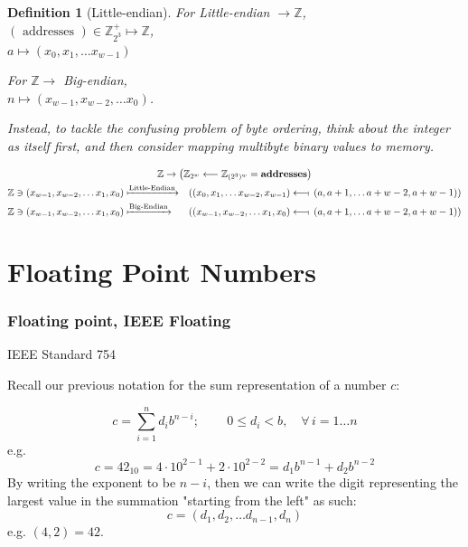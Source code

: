 \documentclass[10pt]{amsart}
\newtheorem{definition}{Definition}
\begin{document}
\begin{multicols*}{2}
\begin{definition}[Little-endian]
For Little-endian $\to \mathbb{Z}$, \\
$( \text{ addresses } ) \in \mathbb{Z}^+_{2^3} \mapsto \mathbb{Z}$, \\
$a \mapsto (x_0, x_1, \dots x_{w-1})$

For $\mathbb{Z} \to $ Big-endian, \\
$n \mapsto (x_{w-1}, x_{w-2}, \dots x_0)$.

Instead, to tackle the confusing problem of byte ordering, think about the integer as itself first, and then consider \emph{mapping multibyte binary values to memory}.

\begin{equation}
\begin{gathered}
\mathbb{Z} \to \left( \mathbb{Z}_{2^w} \longleftarrow \mathbb{Z}_{(2^3)^w} = \textbf{addresses}  \right) \\
\begin{aligned}
& \mathbb{Z} \ni (x_{w-1}, x_{w-2}, \dots x_1, x_0) \xmapsto{\text{Little-Endian}}  & \left((x_0, x_1 , \dots x_{w-2}, x_{w-1}) \longleftarrow\!\shortmid \,  (a, a+1, \dots a + w-2, a+w-1)\right) \\
& \mathbb{Z} \ni (x_{w-1}, x_{w-2}, \dots x_1, x_0) \xmapsto{\text{Big-Endian}}  & \left((x_{w-1}, x_{w-2} , \dots x_{1}, x_{0}) \longleftarrow\!\shortmid \,  (a, a+1, \dots a + w-2, a+w-1)\right) 
\end{aligned}
\end{gathered}
\end{equation}
	
\end{definition}

\part{Floating Point Numbers}

\section{Floating point, IEEE Floating}

IEEE Standard 754

Recall our previous notation for the sum representation of a number $c$:

\begin{equation}
c = \sum_{i=1}^n d_i b^{n-i}; \qquad \, 0 \leq d_i < b , \quad \forall \, i = 1\dots n 
\end{equation}
e.g.
\[
c = 42_{10} = 4 \cdot 10^{2-1} + 2\cdot 10^{2-2} = d_1 b^{n-1} + d_2 b^{n-2}
\]
By writing the exponent to be $n-i$, then we can write the digit representing the largest value in the summation "starting from the left" as such: \\
\[
c = (d_1, d_2, \dots d_{n-1}, d_n)
\]
e.g. $(4, 2) = 42$.


\end{multicols*}
\end{document}
